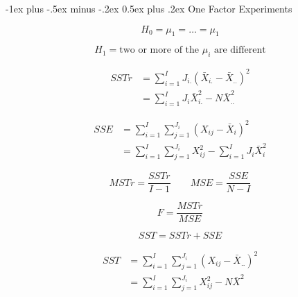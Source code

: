 \documentclass[9pt,landscape]{memoir}
\makeatletter
\renewcommand{\section}{\@startsection{section}{1}{0mm}%
    {-1ex plus -.5ex minus -.2ex}%
    {0.5ex plus .2ex}%
{\normalfont\large\bfseries}}
\makeatother
\begin{document}
\raggedright
\footnotesize
\begin{multicols}{3}
    \section{One Factor Experiments}

            \begin{equation*}
                H_0 = \mu_1 = \ldots = \mu_1
            \end{equation*}

            \begin{equation*}
                H_1 = \text{two or more of the $\mu_i$ are different}
            \end{equation*}

            \begin{align*}
                SSTr &= \sum_{i = 1} ^I J_{i.} {(\bar{X}_{i.} - \bar{X}_{..})}^2 \\
                     &= \sum_{i = 1} ^I J_i \bar{X}_{i.}^2 - N \bar{X}_{..}^2
            \end{align*}

            \begin{align*}
                SSE &= \sum_{i = 1} ^I \sum_{j = 1} ^{J_i} {(X_{ij} - \bar{X}_i)}^2 \\
                    &= \sum _{i = 1} ^I \sum _{j = 1} ^{J_i} X_{ij} ^2 - \sum _{i = 1} ^I J_i \bar{X}_i ^2
            \end{align*}

            \begin{equation*}
                MSTr = \frac{SSTr}{I - 1} \qquad MSE = \frac{SSE}{N - I}
            \end{equation*}

            \begin{equation*}
                F = \frac{MSTr}{MSE}
            \end{equation*}

            \begin{equation*}
                SST = SSTr + SSE
            \end{equation*}

            \begin{align*}
                SST &= \sum _{i = 1} ^I \sum_{j = 1} ^{J_i} {(X_{ij} - \bar{X}_{..})}^2  \\
                    &= \sum _{i = 1} ^I \sum_{j = 1} ^{J_i} X_{ij} ^2 - N\bar{X}^2
            \end{align*}


\end{multicols}
\end{document}
